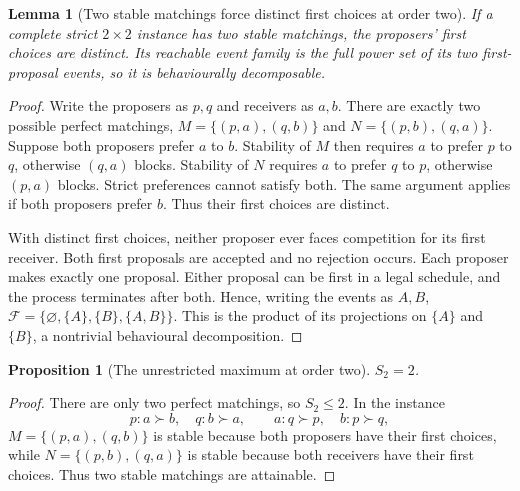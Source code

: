 \documentclass[11pt,a4paper]{article}
\newtheorem{proposition}[theorem]{Proposition}
\newtheorem{lemma}[theorem]{Lemma}
\begin{document}
\begin{lemma}[Two stable matchings force distinct first choices at order two]
If a complete strict $2\times2$ instance has two stable matchings, the proposers' first choices are distinct. Its reachable event family is the full power set of its two first-proposal events, so it is behaviourally decomposable.
\end{lemma}
\begin{proof}
Write the proposers as $p,q$ and receivers as $a,b$. There are exactly two possible perfect matchings,
$M=\{(p,a),(q,b)\}$ and $N=\{(p,b),(q,a)\}$.
Suppose both proposers prefer $a$ to $b$. Stability of $M$ then requires $a$ to prefer $p$ to $q$, otherwise $(q,a)$ blocks. Stability of $N$ requires $a$ to prefer $q$ to $p$, otherwise $(p,a)$ blocks. Strict preferences cannot satisfy both. The same argument applies if both proposers prefer $b$. Thus their first choices are distinct.

With distinct first choices, neither proposer ever faces competition for its first receiver. Both first proposals are accepted and no rejection occurs. Each proposer makes exactly one proposal. Either proposal can be first in a legal schedule, and the process terminates after both. Hence, writing the events as $A,B$,
$\mathcal F=\{\varnothing,\{A\},\{B\},\{A,B\}\}$. This is the product of its projections on $\{A\}$ and $\{B\}$, a nontrivial behavioural decomposition.
\end{proof}

\begin{proposition}[The unrestricted maximum at order two]
$S_2=2$.
\end{proposition}
\begin{proof}
There are only two perfect matchings, so $S_2\leq2$. In the instance
\[
 p:a\succ b,\quad q:b\succ a,\qquad
 a:q\succ p,\quad b:p\succ q,
\]
$M=\{(p,a),(q,b)\}$ is stable because both proposers have their first choices, while $N=\{(p,b),(q,a)\}$ is stable because both receivers have their first choices. Thus two stable matchings are attainable.
\end{proof}
\end{document}
